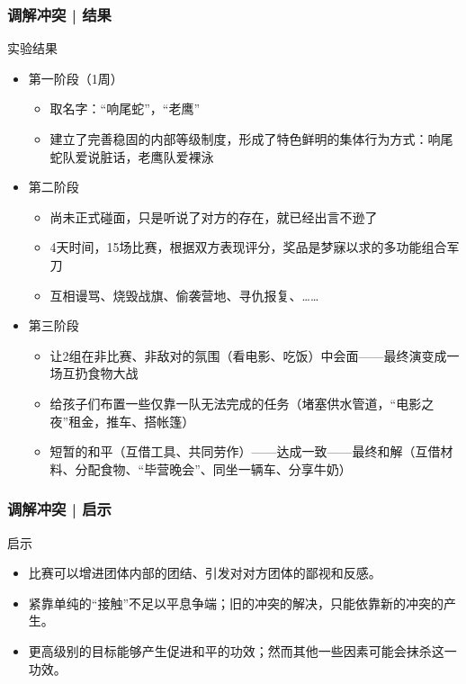 \begin{frame}
  \frametitle{调解冲突 | 结果}
  \begin{block}{实验结果}
    \begin{itemize}
      \item 第一阶段（1周）
    \begin{itemize}
      \item 取名字：“响尾蛇”，“老鹰”
      \item 建立了完善稳固的内部等级制度，形成了特色鲜明的集体行为方式：响尾蛇队爱说脏话，老鹰队爱裸泳
    \end{itemize}
      \item 第二阶段
    \begin{itemize}
      \item 尚未正式碰面，只是听说了对方的存在，就已经出言不逊了
      \item 4天时间，15场比赛，根据双方表现评分，奖品是梦寐以求的多功能组合军刀
      \item 互相谩骂、烧毁战旗、偷袭营地、寻仇报复、……
    \end{itemize}
      \item 第三阶段
    \begin{itemize}
      \item 让2组在非比赛、非敌对的氛围（看电影、吃饭）中会面——最终演变成一场互扔食物大战
      \item 给孩子们布置一些仅靠一队无法完成的任务（堵塞供水管道，“电影之夜”租金，推车、搭帐篷）
      \item 短暂的和平（互借工具、共同劳作）——达成一致——最终和解（互借材料、分配食物、“毕营晚会”、同坐一辆车、分享牛奶）
    \end{itemize}
    \end{itemize}
  \end{block}
\end{frame}

\begin{frame}
  \frametitle{调解冲突 | \alert{启示}}
  \begin{block}{启示}
    \begin{itemize}
      \item 比赛可以增进团体内部的团结、引发对对方团体的鄙视和反感。
      \item 紧靠单纯的“接触”不足以平息争端；旧的冲突的解决，只能依靠新的冲突的产生。
      \item 更高级别的目标能够产生促进和平的功效；然而其他一些因素可能会抹杀这一功效。
    \end{itemize}
  \end{block}
\end{frame}

